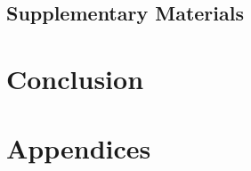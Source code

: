 \documentclass[a4paper,oneside,nobind]{thesis}
\begin{document}
\chapter{Supplementary Materials}
{\hypersetup{linkcolor=GREYDARK}\minitoc}


\part{Conclusion}
\label{part:discussion}

%

\part*{Appendices}


\end{document}
